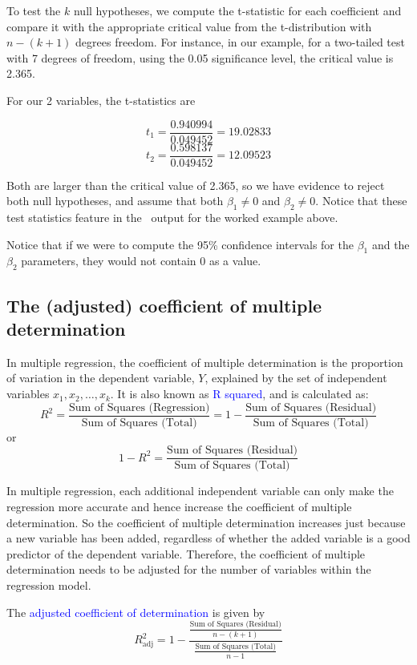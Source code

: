 \documentclass[12pt,a4paper,openany,twoside]{report}
\newcommand{\blue}{\textcolor{blue}}
\newcommand{\emphx}[1]{\blue{#1}}
\theoremstyle{definition}
\theoremstyle{remark}
\theoremstyle{plain}
\newcommand{\vsps}{\vspace{.5cm}}
\newcommand{\sR}[1]{\textbf{R}\,}
\theoremstyle{definition}
\theoremstyle{definition}
\theoremstyle{definition}
\theoremstyle{remark}
\begin{document}
\vsps

To test the \(k\) null hypotheses, we compute the t-statistic for each
coefficient and compare it with the appropriate critical value from the
t-distribution with \(n-(k+1)\) degrees freedom. For instance, in our
example, for a two-tailed test with 7 degrees of freedom, using the 0.05
significance level, the critical value is 2.365.

For our 2 variables, the t-statistics are

\[t_{1} = \frac{0.940994}{0.049452} = 19.02833\]
\[t_{2} = \frac{0.598137}{0.049452} = 12.09523\]

Both are larger than the critical value of 2.365, so we have evidence
to reject both null hypotheses, and assume that both
\(\beta_{1} \neq 0\) and \(\beta_{2} \neq 0\). Notice that these test statistics feature in the \sR~output for the worked example above.

Notice that if we were to compute the 95\% confidence intervals for the \(\beta_1\) and the \(\beta_2\) parameters, they would not contain 0 as a value.

\newpage

\hypertarget{adjustedr2}{%
\subsection{The (adjusted) coefficient of multiple determination}\label{adjustedr2}}

In multiple regression, the coefficient of multiple determination is the
proportion of variation in the dependent variable, \(Y\), explained by
the set of independent variables \(x_{1},x_{2},\ldots,x_{k}\). It is
also known as \emphx{R squared}, and is calculated as:
\[R^{2} = \frac{\mbox{Sum of Squares (Regression)}}{\mbox{Sum of Squares (Total)}} = 1 - \frac{\mbox{Sum of Squares (Residual)}}{\mbox{Sum of Squares (Total)}}\]
or
\[1 - R^{2} = \frac{\mbox{Sum of Squares (Residual)}}{\mbox{Sum of Squares (Total)}}\]

In multiple regression, each additional independent variable can only
make the regression more accurate and hence increase the coefficient of
multiple determination. So the coefficient of multiple determination
increases just because a new variable has been added, regardless of
whether the added variable is a good predictor of the dependent
variable. Therefore, the coefficient of multiple determination needs to
be adjusted for the number of variables within the regression model.

The \emphx{adjusted coefficient of determination} is given by
\[R_{\text{adj}}^{2} = 1 - \frac{\frac{\mbox{Sum of Squares (Residual)}}{n - (k + 1)}}{\frac{\mbox{Sum of Squares (Total)}}{n - 1}}\]
\end{document}
